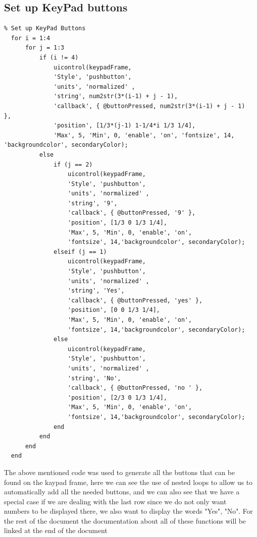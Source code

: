 \documentclass[a4paper, 10pt]{article}
\begin{document}
		\subsection{Set up KeyPad buttons}
		\begin{lstlisting}
% Set up KeyPad Buttons
  for i = 1:4
	  for j = 1:3
		  if (i != 4)
			  uicontrol(keypadFrame,
			  'Style', 'pushbutton',
			  'units', 'normalized' ,
			  'string', num2str(3*(i-1) + j - 1),
			  'callback', { @buttonPressed, num2str(3*(i-1) + j - 1) },
			  'position', [1/3*(j-1) 1-1/4*i 1/3 1/4],
			  'Max', 5, 'Min', 0, 'enable', 'on', 'fontsize', 14, 'backgroundcolor', secondaryColor);
		  else
			  if (j == 2)
				  uicontrol(keypadFrame,
				  'Style', 'pushbutton',
				  'units', 'normalized' ,
				  'string', '9',
				  'callback', { @buttonPressed, '9' },
				  'position', [1/3 0 1/3 1/4],
				  'Max', 5, 'Min', 0, 'enable', 'on',
				  'fontsize', 14,'backgroundcolor', secondaryColor);
			  elseif (j == 1)
				  uicontrol(keypadFrame,
				  'Style', 'pushbutton',
				  'units', 'normalized' ,
				  'string', 'Yes',
				  'callback', { @buttonPressed, 'yes' },
				  'position', [0 0 1/3 1/4],
				  'Max', 5, 'Min', 0, 'enable', 'on',
				  'fontsize', 14,'backgroundcolor', secondaryColor);
			  else
				  uicontrol(keypadFrame,
				  'Style', 'pushbutton',
				  'units', 'normalized' ,
				  'string', 'No',
				  'callback', { @buttonPressed, 'no ' },
				  'position', [2/3 0 1/3 1/4],
				  'Max', 5, 'Min', 0, 'enable', 'on',
				  'fontsize', 14,'backgroundcolor', secondaryColor);
			  end
		  end
	  end
  end
		\end{lstlisting}
		\vspace{3mm}
		\noindent The above mentioned code was used to generate all the buttons that can be found on the kaypad frame, here we can see the use of nested loops to allow us to automatically add all the needed buttons, and we can also see that we have a special
		case if we are dealing with the last row since we do not only want numbers to be displayed there, we also want to display the words "Yes", "No". For the rest of the document the documentation about all of these functions will be linked at the end of the
		document

		\pagebreak
\end{document}
